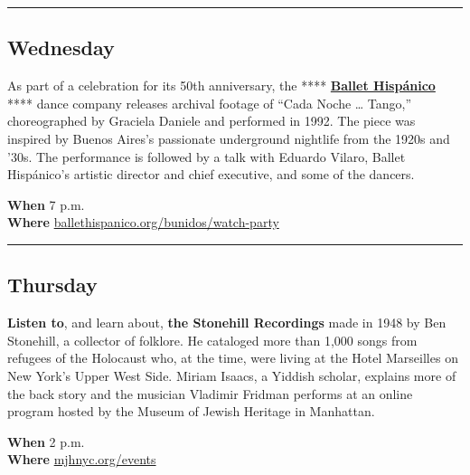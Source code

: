 \begin{center}\rule{0.5\linewidth}{\linethickness}\end{center}

\hypertarget{wednesday}{%
\subsection{Wednesday}\label{wednesday}}

As part of a celebration for its 50th anniversary, the ****
\textbf{\href{https://www.nytimes3xbfgragh.onion/2019/11/24/arts/dance/ballet-hispanico-review.html}{Ballet
Hispánico}} **** dance company releases archival footage of ``Cada Noche
\ldots{} Tango,'' choreographed by Graciela Daniele and performed in
1992. The piece was inspired by Buenos Aires's passionate underground
nightlife from the 1920s and '30s. The performance is followed by a talk
with Eduardo Vilaro, Ballet Hispánico's artistic director and chief
executive, and some of the dancers.

\textbf{When} 7 p.m.\\
\textbf{Where}
\href{http://r20.rs6.net/tn.jsp?f=001_OFfEphF10YZ0-xbGzNCumLortXyKLcRheOhwr0XLWtvahF7bSg32WekAkesfMsmNiMlfbgkcfdvMW9kj5G5jo6vqo9r4Q_2KntBZsbwGWrT4V4mfOq6iRLIGwqAaR35sRgWiaFm__ou0GAnhiJIJhvAOkwN-Aef-v_jr14ojl6dyO1I3g6Oje3wSlCUlVf5p5r2vUqCg11WNXY5jri_NA==\&c=kJatXI4cJaEJSfIoW6aZUvG23ITP-YMH-FZGBLLT4aZqaYX8iL1bGg==\&ch=jtv5g6Fw5AS-c0CZDIngHS4580VSgllMogfK8wt_zmrBMvScABCZyA==}{ballethispanico.org/bunidos/watch-party}

\begin{center}\rule{0.5\linewidth}{\linethickness}\end{center}

\hypertarget{thursday}{%
\subsection{Thursday}\label{thursday}}

\textbf{Listen to}, and learn about, \textbf{the Stonehill Recordings}
made in 1948 by Ben Stonehill, a collector of folklore. He cataloged
more than 1,000 songs from refugees of the Holocaust who, at the time,
were living at the Hotel Marseilles on New York's Upper West Side.
Miriam Isaacs, a Yiddish scholar, explains more of the back story and
the musician Vladimir Fridman performs at an online program hosted by
the Museum of Jewish Heritage in Manhattan.

\textbf{When} 2 p.m.\\
\textbf{Where}
\href{https://mjhnyc.org/events/survivor-songs-amazing-stonehill-recordings/}{mjhnyc.org/events}

